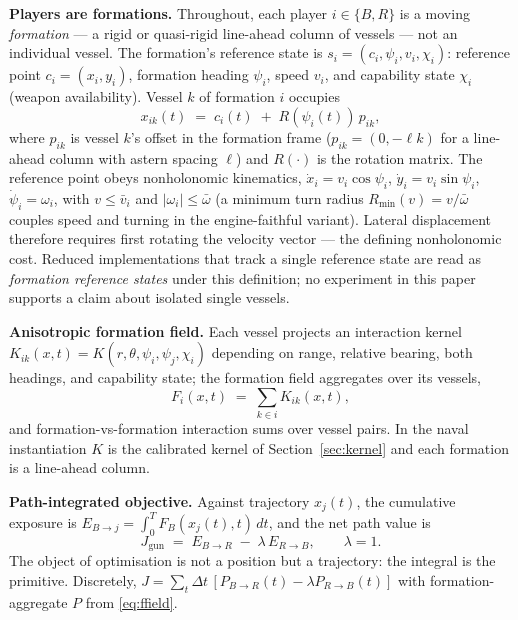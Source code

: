 \documentclass[12pt,a4paper]{article}
\begin{document}
\noindent\textbf{Players are formations.}  Throughout, each player
$i\in\{B,R\}$ is a moving \emph{formation} --- a rigid or quasi-rigid
line-ahead column of vessels --- not an individual vessel.  The formation's
reference state is $s_i=(c_i,\psi_i,v_i,\chi_i)$: reference point
$c_i=(x_i,y_i)$, formation heading $\psi_i$, speed $v_i$, and capability
state $\chi_i$ (weapon availability).  Vessel $k$ of formation $i$ occupies
\begin{equation}
x_{ik}(t) \;=\; c_i(t) \;+\; R(\psi_i(t))\, p_{ik},
\label{eq:formation}
\end{equation}
where $p_{ik}$ is vessel $k$'s offset in the formation frame ($p_{ik}=(0,
-\ell k)$ for a line-ahead column with astern spacing $\ell$) and
$R(\cdot)$ is the rotation matrix.  The reference point obeys nonholonomic
kinematics, $\dot x_i=v_i\cos\psi_i$, $\dot y_i=v_i\sin\psi_i$,
$\dot\psi_i=\omega_i$, with $v\le\bar v_i$ and $|\omega_i|\le\bar\omega$ (a
minimum turn radius $R_{\min}(v)=v/\bar\omega$ couples speed and turning in
the engine-faithful variant).  Lateral displacement therefore requires first
rotating the velocity vector --- the defining nonholonomic cost.  Reduced
implementations that track a single reference state are read as
\emph{formation reference states} under this definition; no experiment in
this paper supports a claim about isolated single vessels.

\noindent\textbf{Anisotropic formation field.}  Each vessel projects an
interaction kernel $K_{ik}(x,t)=K(r,\theta,\psi_i,\psi_j,\chi_i)$ depending
on range, relative bearing, both headings, and capability state; the
formation field aggregates over its vessels,
\begin{equation}
F_i(x,t) \;=\; \sum_{k\in i} K_{ik}(x,t),
\label{eq:ffield}
\end{equation}
and formation-vs-formation interaction sums over vessel pairs.  In the
naval instantiation $K$ is the calibrated kernel of
Section~\ref{sec:kernel} and each formation is a line-ahead column.

\noindent\textbf{Path-integrated objective.}  Against trajectory $x_j(t)$,
the cumulative exposure is $E_{B\to j}=\int_0^T F_B(x_j(t),t)\,dt$, and the
net path value is
\begin{equation}
J_{\text{gun}} \;=\; E_{B\to R} \;-\; \lambda\, E_{R\to B},
\qquad \lambda = 1.
\label{eq:J}
\end{equation}
The object of optimisation is not a position but a trajectory: the integral
is the primitive.  Discretely, $J=\sum_t \Delta t\,[P_{B\to R}(t)-\lambda
P_{R\to B}(t)]$ with formation-aggregate $P$ from \eqref{eq:ffield}.
\end{document}
